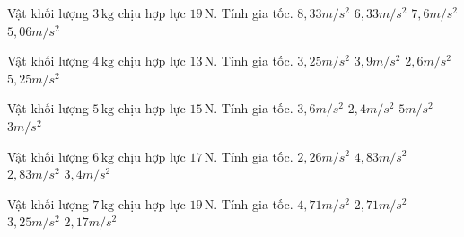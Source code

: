 

\begin{ex}
Vật khối lượng $3\,\text{kg}$ chịu hợp lực $19\,\text{N}$. Tính gia tốc.
\choice
{$8,33 m/s^2$}
{\True $6,33 m/s^2$}
{$7,6 m/s^2$}
{$5,06 m/s^2$}
\end{ex}

\begin{ex}
Vật khối lượng $4\,\text{kg}$ chịu hợp lực $13\,\text{N}$. Tính gia tốc.
\choice
{\True $3,25 m/s^2$}
{$3,9 m/s^2$}
{$2,6 m/s^2$}
{$5,25 m/s^2$}
\end{ex}

\begin{ex}
Vật khối lượng $5\,\text{kg}$ chịu hợp lực $15\,\text{N}$. Tính gia tốc.
\choice
{$3,6 m/s^2$}
{$2,4 m/s^2$}
{$5 m/s^2$}
{\True $3 m/s^2$}
\end{ex}

\begin{ex}
Vật khối lượng $6\,\text{kg}$ chịu hợp lực $17\,\text{N}$. Tính gia tốc.
\choice
{$2,26 m/s^2$}
{$4,83 m/s^2$}
{\True $2,83 m/s^2$}
{$3,4 m/s^2$}
\end{ex}

\begin{ex}
Vật khối lượng $7\,\text{kg}$ chịu hợp lực $19\,\text{N}$. Tính gia tốc.
\choice
{$4,71 m/s^2$}
{\True $2,71 m/s^2$}
{$3,25 m/s^2$}
{$2,17 m/s^2$}
\end{ex}

